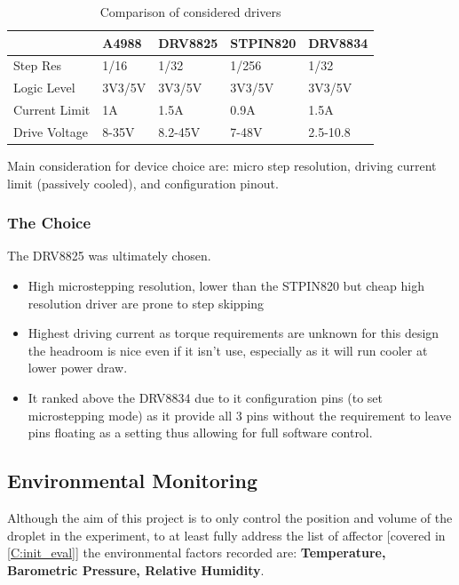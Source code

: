 \begin{table}[h]
    \centering
    \begin{tabular}{|l|l|l|l|l|}
        \hline
        \textbf{}     & \textbf{A4988} & \textbf{DRV8825} & \textbf{STPIN820} & \textbf{DRV8834} \\ \hline
        Step Res      & 1/16           & 1/32             & 1/256             & 1/32             \\ \hline
        Logic Level   & 3V3/5V         & 3V3/5V           & 3V3/5V            & 3V3/5V           \\ \hline
        Current Limit & 1A             & 1.5A             & 0.9A              & 1.5A             \\ \hline
        Drive Voltage & 8-35V          & 8.2-45V          & 7-48V             & 2.5-10.8         \\ \hline
    \end{tabular}
    \caption{Comparison of considered drivers}
\end{table}

Main consideration for device choice are: micro step resolution, driving current limit (passively cooled), and configuration pinout.

\subsubsection*{The Choice}
The DRV8825 was ultimately chosen.
\begin{itemize}
    \item High microstepping resolution, lower than the STPIN820 but cheap high resolution driver are prone to step skipping \cite{step_book}
    \item Highest driving current as torque requirements are unknown for this design the headroom is nice even if it isn't use, especially as it will run cooler at lower power draw.
    \item It ranked above the DRV8834 due to it configuration pins (to set microstepping mode) as it provide all 3 pins without the requirement to leave pins floating as a setting thus allowing for full software control.
\end{itemize}

\newpage
\subsection{Environmental Monitoring}

Although the aim of this project is to only control the position and volume of the droplet in the experiment, to at least fully address the list of affector [covered in \ref{C:init_eval}] the environmental factors recorded are: \textbf{Temperature, Barometric Pressure, Relative Humidity}.

